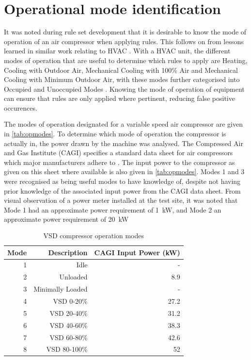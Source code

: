 \bigskip

\section{Operational mode identification}
\label{sec:modeidentification}
It was noted during rule set development that it is desirable to know the mode of operation of an air compressor when applying rules. This follows on from lessons learned in similar work relating to HVAC \cite{Bruton2014}. With a HVAC unit, the different modes of operation that are useful to determine which rules to apply are Heating, Cooling with Outdoor Air, Mechanical Cooling with 100\% Air and Mechanical Cooling with Minimum Outdoor Air, with these modes further categorised into Occupied and Unoccupied Modes \cite{House2001}. Knowing the mode of operation of equipment can ensure that rules are only applied where pertinent, reducing false positive occurences.

The modes of operation designated for a variable speed air compressor are given in \autoref{tab:opmodes}. To determine which mode of operation the compressor is actually in, the power drawn by the machine was analysed. The Compressed Air and Gas Institute (CAGI) specifies a standard data sheet for air compressors which major manufacturers adhere to \cite{CAGI}. The input power to the compressor as given on this sheet where available is also given in \autoref{tab:opmodes}. Modes 1 and 3 were recognised as being useful modes to have knowledge of, despite not having prior knowledge of the associated input power from the CAGI data sheet. From visual observation of a power meter installed at the test site, it was noted that Mode 1 had an approximate power requirement of \SI{1}{\kilo \watt}, and Mode 2 an approximate power requirement of \SI{20}{\kilo \watt}

\begin{table}[htbp]
  \centering
  \caption{VSD compressor operation modes}
    \begin{tabular}{rrr}
    \toprule
    Mode  & Description & CAGI Input Power (kW)\\
    \midrule
    1     & Idle & -\\
    2     & Unloaded & 8.9 \\
    3     & Minimally Loaded & - \\
    4     & VSD 0-20\% & 27.2 \\
    5     & VSD 20-40\% & 31.2 \\
    6     & VSD 40-60\% & 38.3\\
    7     & VSD 60-80\% & 42.6 \\
    8     & VSD 80-100\% & 52\\
    \bottomrule
    \end{tabular}%
  \label{tab:opmodes}%
\end{table}%

